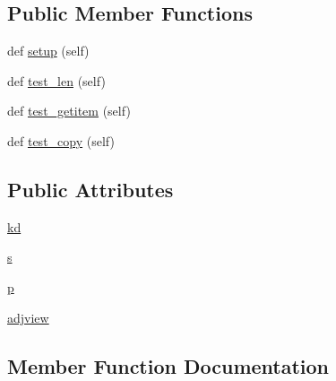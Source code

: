 \subsection*{Public Member Functions}
\begin{DoxyCompactItemize}
\item 
def \hyperlink{classnetworkx_1_1classes_1_1tests_1_1test__coreviews_1_1TestUnionMultiInner_a0029f50109126a010548e9dc255515d2}{setup} (self)
\item 
def \hyperlink{classnetworkx_1_1classes_1_1tests_1_1test__coreviews_1_1TestUnionMultiInner_a5b240841ae3cdc482758c75123229753}{test\+\_\+len} (self)
\item 
def \hyperlink{classnetworkx_1_1classes_1_1tests_1_1test__coreviews_1_1TestUnionMultiInner_adade3a72037bc998527d401f5f303072}{test\+\_\+getitem} (self)
\item 
def \hyperlink{classnetworkx_1_1classes_1_1tests_1_1test__coreviews_1_1TestUnionMultiInner_a0a111d7b6a25012f05a726fe8a780f1c}{test\+\_\+copy} (self)
\end{DoxyCompactItemize}
\subsection*{Public Attributes}
\begin{DoxyCompactItemize}
\item 
\hyperlink{classnetworkx_1_1classes_1_1tests_1_1test__coreviews_1_1TestUnionMultiInner_a58fd2e0bfa9596ec3ed8b74645bd79c9}{kd}
\item 
\hyperlink{classnetworkx_1_1classes_1_1tests_1_1test__coreviews_1_1TestUnionMultiInner_acbd2b841bf8bd7fcba2a14e7d653f6e6}{s}
\item 
\hyperlink{classnetworkx_1_1classes_1_1tests_1_1test__coreviews_1_1TestUnionMultiInner_ac7c7f78a9d857f8615034a56065b1bbe}{p}
\item 
\hyperlink{classnetworkx_1_1classes_1_1tests_1_1test__coreviews_1_1TestUnionMultiInner_aadf5c2eeb204b26a5588460b4072aed0}{adjview}
\end{DoxyCompactItemize}


\subsection{Member Function Documentation}
\mbox{\label{classnetworkx_1_1classes_1_1tests_1_1test__coreviews_1_1TestUnionMultiInner_a0029f50109126a010548e9dc255515d2}} 
